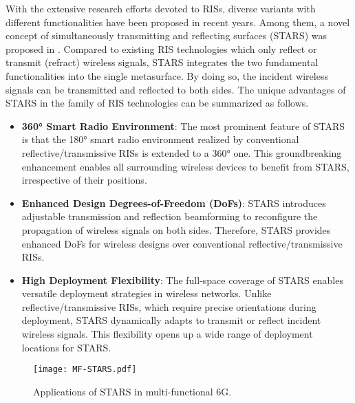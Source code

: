 \documentclass[journal]{IEEEtran}
\theoremstyle{definition}
\begin{document}
With the extensive research efforts devoted to RISs, diverse variants with different functionalities have been proposed in recent years. Among them, a novel concept of simultaneously transmitting and reflecting surfaces (STARS) was proposed in \cite{9570143}. Compared to existing RIS technologies which only reflect or transmit (refract) wireless signals, STARS integrates the two fundamental functionalities into the single metasurface. By doing so, the incident wireless signals can be transmitted and reflected to both sides. The unique advantages of STARS in the family of RIS technologies can be summarized as follows.
\begin{itemize}	
	\item \textbf{360° Smart Radio Environment}: The most prominent feature of STARS is that the 180° smart radio environment realized by conventional reflective/transmissive RISs is extended to a 360° one.  This groundbreaking enhancement enables all surrounding wireless devices to benefit from STARS, irrespective of their positions. 
    \item \textbf{Enhanced Design Degrees-of-Freedom (DoFs)}: STARS introduces adjustable transmission and reflection beamforming to reconfigure the propagation of wireless signals on both sides. Therefore, STARS provides enhanced DoFs for wireless designs over conventional reflective/transmissive RISs.
    \item \textbf{High Deployment Flexibility}: The full-space coverage of STARS enables versatile deployment strategies in wireless networks. Unlike reflective/transmissive RISs, which require precise orientations during deployment, STARS dynamically adapts to transmit or reflect incident wireless signals. This flexibility opens up a wide range of deployment locations for STARS.
\end{itemize}	
\begin{figure*}[t!]
\begin{center}
    \texttt{[image: MF-STARS.pdf]}
    \caption{Applications of STARS in multi-functional 6G.}
    \label{STAR_1}
\end{center}
\end{figure*}
\end{document}
